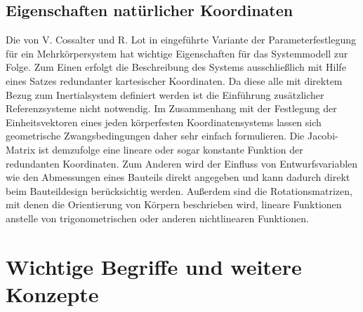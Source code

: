 \subsection{Eigenschaften nat\"urlicher Koordinaten}
  Die von V. Cossalter und R. Lot in \cite{Cossalter2002} eingef\"uhrte Variante der Parameterfestlegung f\"ur ein Mehrk\"orpersystem hat wichtige Eigenschaften f\"ur das Systemmodell zur Folge. \hfill \newline
  Zum Einen erfolgt die Beschreibung des Systems ausschlie\ss{}lich mit Hilfe eines Satzes redundanter kartesischer Koordinaten. Da diese alle mit direktem Bezug zum Inertialsystem definiert werden ist die Einf\"uhrung zus\"atzlicher Referenzsysteme nicht notwendig. Im Zusammenhang mit der Festlegung der Einheitsvektoren eines jeden k\"orperfesten Koordinatensystems lassen sich geometrische Zwangsbedingungen daher sehr einfach formulieren. Die Jacobi-Matrix ist demzufolge eine lineare oder sogar konstante Funktion der redundanten Koordinaten. Zum Anderen wird der Einfluss von Entwurfsvariablen wie den Abmessungen eines Bauteils direkt angegeben und kann dadurch direkt beim Bauteildesign ber\"ucksichtig werden.  Au\ss{}erdem sind die Rotationsmatrizen, mit denen die Orientierung von K\"orpern beschrieben wird, lineare Funktionen anstelle von trigonometrischen oder anderen nichtlinearen Funktionen.  

\section{Wichtige Begriffe und weitere Konzepte}
